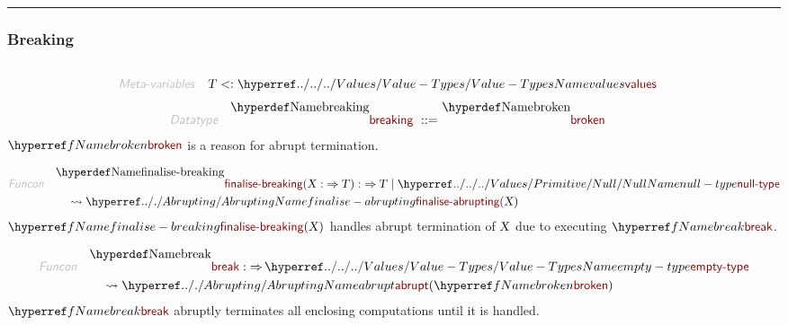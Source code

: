 

\begin{center}
\rule{3in}{0.4pt}
\end{center}

\subsubsection{Breaking}\hypertarget{breaking}{}\label{breaking}

\begin{align*}
  [ \
  \KEY{Datatype} \quad & \NAMEREF{breaking} \\
  \KEY{Funcon} \quad & \NAMEREF{broken} \\
  \KEY{Funcon} \quad & \NAMEREF{finalise-breaking} \\
  \KEY{Funcon} \quad & \NAMEREF{break} \\
  \KEY{Funcon} \quad & \NAMEREF{handle-break}
  \ ]
\end{align*}
\begin{align*}
  \KEY{Meta-variables} \quad
  & \VAR{T} <: \NAMEHYPER{../../../Values}{Value-Types}{values}
\end{align*}
\begin{align*}
  \KEY{Datatype} \quad 
  \NAMEDECL{breaking} 
  \ ::= \ & \NAMEDECL{broken}
\end{align*}
$\SHADE{\NAMEREF{broken}}$ is a reason for abrupt termination.

\begin{align*}
  \KEY{Funcon} \quad
  & \NAMEDECL{finalise-breaking}(
                       \VAR{X} :  \TO \VAR{T}) 
    :  \TO \VAR{T}  \mid \NAMEHYPER{../../../Values/Primitive}{Null}{null-type} \\&\quad
    \leadsto \NAMEHYPER{../.}{Abrupting}{finalise-abrupting}
               (  \VAR{X} )
\end{align*}
$\SHADE{\NAMEREF{finalise-breaking}
           (  \VAR{X} )}$ handles abrupt termination of $\SHADE{\VAR{X}}$ due to executing
  $\SHADE{\NAMEREF{break}}$.

\begin{align*}
  \KEY{Funcon} \quad
  & \NAMEDECL{break} 
    :  \TO \NAMEHYPER{../../../Values}{Value-Types}{empty-type} \\&\quad
    \leadsto \NAMEHYPER{../.}{Abrupting}{abrupt}
               (  \NAMEREF{broken} )
\end{align*}
$\SHADE{\NAMEREF{break}}$ abruptly terminates all enclosing computations until it is handled.

